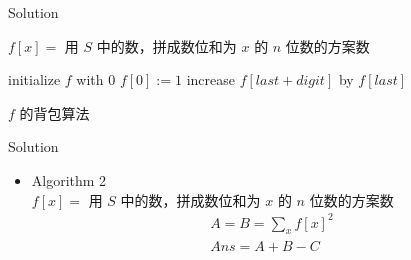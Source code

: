 \documentclass[UTF8]{beamer}
\begin{document}
\begin{frame}{Solution}

$f[x] =$ 用 $S$ 中的数，拼成数位和为 $x$ 的 $n$ 位数的方案数

\begin{algorithm}[H]
\begin{algorithmic}[1]
    \STATE initialize $f$ with 0
    \STATE $f[0] := 1$
                \STATE increase $f[last + digit]$ by $f[last]$
            \ENDFOR
        \ENDFOR
    \ENDFOR
\end{algorithmic}
\caption{$f$ 的背包算法}
\label{alg:seq}
\end{algorithm}

\end{frame}

\begin{frame}{Solution}

\begin{itemize}
    \item Algorithm 2 \\
        $f[x] =$ 用 $S$ 中的数，拼成数位和为 $x$ 的 $n$ 位数的方案数
        \begin{equation*}\begin{split}
            A = B = \sum_{x} f[x]^2 \\
            Ans = A + B - C
        \end{split}\end{equation*}


\end{itemize}

\end{frame}
\end{document}
